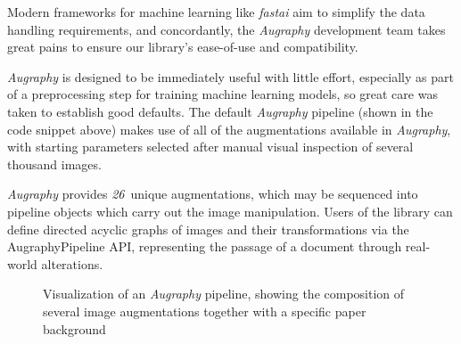 \documentclass[runningheads]{llncs}
\newcommand{\numAugraphyAugmentations}{\emph{26}}
\begin{document}
Modern frameworks for machine learning like \emph{fastai} \cite{ref_fastai} aim to simplify the data handling requirements, and concordantly, the \emph{Augraphy} development team takes great pains to ensure our library's ease-of-use and compatibility.

\emph{Augraphy} is designed to be immediately useful with little effort, especially as part of a preprocessing step for training machine learning models, so great care was taken to establish good defaults.
The default \emph{Augraphy} pipeline (shown in the code snippet above) makes use of all of the augmentations available in \emph{Augraphy}, with starting parameters selected after manual visual inspection of several thousand images.

\emph{Augraphy} provides \numAugraphyAugmentations ~unique augmentations, which may be sequenced into pipeline objects which carry out the image manipulation.
Users of the library can define directed acyclic graphs of images and their transformations via the AugraphyPipeline API, representing the passage of a document through real-world alterations.

\begin{figure}
\centering
{}
\caption{Visualization of an \emph{Augraphy} pipeline, showing the composition of several image augmentations together with a specific paper background}
\label{fig:pipeline}
\end{figure}
\end{document}
